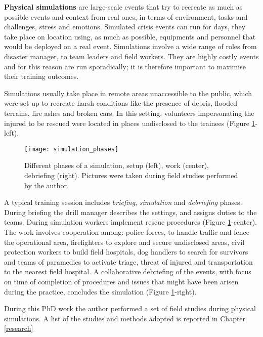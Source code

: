 \textbf{Physical simulations} are large-scale events that try to recreate as much as possible events and context from real ones, in terms of environment, tasks and challenges, stress and emotions. Simulated crisis events can run for days, they take place on location using, as much as possible, equipments and personnel that would be deployed on a real event. Simulations involve a wide range of roles from disaster manager, to team leaders and field workers. They are highly costly events and for this reason are run sporadically; it is therefore important to maximise their training outcomes.

Simulations usually take place in remote areas unaccessible to the public, which were set up to recreate harsh conditions like the presence of debris, flooded terrains, fire ashes and broken cars. In this setting, volunteers impersonating the injured to be rescued were located in places undisclosed to the trainees (Figure \ref{fig:simulation-phases}-left).
\begin{figure}
	[tbh] \centering 
	\texttt{[image: simulation\_phases]} \caption{Different phases of a simulation, setup (left), work (center), debriefing (right). Pictures were taken during field studies performed by the author.} \label{fig:simulation-phases} 
\end{figure}

A typical training session includes \emph{briefing}, \emph{simulation} and \emph{debriefing} phases. During briefing the drill manager describes the settings, and assigns duties to the teams. During simulation workers implement rescue procedures (Figure \ref{fig:simulation-phases}-center). The work involves cooperation among: police forces, to handle traffic and fence the operational area, firefighters to explore and secure undisclosed areas, civil protection workers to build field hospitals, dog handlers to search for survivors and teams of paramedics to activate triage, threat of injured and transportation to the nearest field hospital. A collaborative debriefing of the events, with focus on time of completion of procedures and issues that might have been arisen during the practice, concludes the simulation (Figure \ref{fig:simulation-phases}-right).

During this PhD work the author performed a set of field studies during physical simulations. A list of the studies and methods adopted is reported in Chapter \ref{research}

